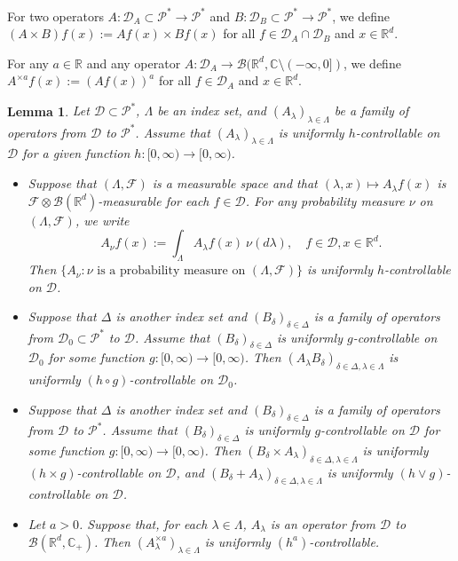 \documentclass[12pt,a4paper]{amsart}
\theoremstyle{plain}
\newtheorem{lem}[thm]{Lemma}
\theoremstyle{definition}
\numberwithin{equation}{section}
\begin{document}
    For two operators $A: \mathcal D_A \subset \mathcal P^*\to \mathcal P^*$ and $B: \mathcal D_B \subset \mathcal P^*\to \mathcal P^*$, we define $(A \times B)f (x):= Af(x) \times Bf(x)$ for all $f\in \mathcal D_A \cap \mathcal D_B$ and $x\in \mathbb{R}^d$.
    
    For any $a \in \mathbb R$ and any operator
    $A :\mathcal D_A \to \mathcal B(\mathbb R^d, \mathbb C\setminus (-\infty, 0])$, we define $A^{\times a}f(x):= (Af(x))^a$ for all $f\in \mathcal D_A$ and $x\in \mathbb R^d$.

\begin{lem}
    \label{lem: property of controllable operators}
    Let $\mathcal D \subset \mathcal P^*$, $\Lambda$ be an index set, and $(A_\lambda)_{\lambda\in \Lambda}$ be a family of operators from $\mathcal D$ to $ \mathcal P^*$. Assume that $(A_\lambda)_{\lambda\in \Lambda}$ is uniformly $h$-controllable on $\mathcal D$ for a given function $h:[0,\infty) \to [0, \infty)$.
\begin{itemize}
\item[(1)]
    Suppose that $(\Lambda, \mathscr F)$ is a measurable space
    and that $(\lambda,x)\mapsto A_\lambda f(x)$ is $\mathscr F \otimes \mathscr B(\mathbb R^d)$-measurable for each $f\in \mathcal D$.
    For any probability measure $\nu$ on $(\Lambda, \mathscr F)$,  we write
\[
    A_\nu f(x):= \int_{\Lambda} A_\lambda f (x)~\nu(d\lambda), \quad f\in \mathcal D, x\in \mathbb R^d.
\]
    Then  $\{A_\nu: \nu \text{ is  a probability measure on } (\Lambda, \mathscr F)\}$ is uniformly $h$-controllable on $\mathcal D$.
\item[(2)]
    Suppose that $\Delta$ is another index set and $(B_\delta)_{\delta\in \Delta}$ is a family of operators from $\mathcal D_0\subset \mathcal P^*$ to $ \mathcal D$.
    Assume that $(B_\delta)_{\delta\in \Delta}$ is uniformly $g$-controllable on $\mathcal D_0$ for some function $g: [0,\infty) \to [0,\infty)$.
    Then  $(A_\lambda B_\delta)_{\delta\in \Delta, \lambda \in \Lambda}$ is uniformly $(h \circ g)$-controllable on $\mathcal D_0$.
\item[(3)]
    Suppose that $\Delta$ is another index set and $(B_\delta)_{\delta\in \Delta}$ is a family of operators from $\mathcal D$ to $ \mathcal P^*$.
    Assume that $(B_\delta)_{\delta\in \Delta}$ is uniformly $g$-controllable on $\mathcal D$ for some function $g: [0,\infty) \to [0,\infty)$.
    Then  $(B_\delta\times A_\lambda)_{\delta \in \Delta, \lambda \in \Lambda}$ is uniformly $(h\times g)$-controllable on $\mathcal D$, and $(B_\delta + A_\lambda)_{\delta \in \Delta, \lambda \in \Lambda}$ is uniformly $(h\vee g)$-controllable on $\mathcal D$.
\item[(4)]
    Let $a>0$. Suppose that, for each $\lambda \in \Lambda$, $A_\lambda$ is an operator from $\mathcal D$ to $\mathcal B(\mathbb R^d, \mathbb C_+)$.
    Then $(A^{\times a}_\lambda)_{\lambda \in \Lambda}$ is uniformly $(h^a)$-controllable.
\end{itemize}
\end{lem}
\end{document}

